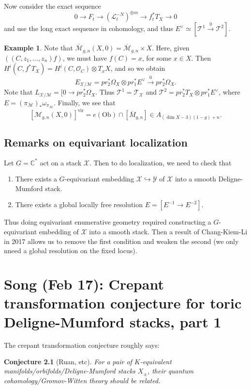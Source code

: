 \documentclass[leqno, openany]{memoir}
\newtheorem{conj}[thm]{Conjecture}
\theoremstyle{definition}
\newtheorem{exm}[thm]{Example}
\theoremstyle{remark}
\theoremstyle{plain}
\theoremstyle{definition}
\theoremstyle{remark}
\newcommand{\C}{\mathbb{C}}
\newcommand{\mc}[1]{\mathcal{#1}}
\newcommand{\mr}[1]{\mathrm{#1}}
\newcommand{\ol}[1]{\overline{#1}}
\begin{document}
Now consider the exact sequence
\[ 0 \to F_t \to (\mc{L}_t^{-N})^{\oplus m} \to f_t^* T_X \to 0 \]
and use the long exact sequence in cohomology, and thus $E^{\vee} \simeq [\mc{T}^1 \xrightarrow{0} \mc{T}^2]$.

\begin{exm}
    Note that $\ol{\mc{M}}_{g, n}(X, 0) = \ol{\mc{M}}_{g,n} \times X$. Here, given $((C, z_1, \ldots, z_n) f)$, we must have $f(C) = x$, for some $x \in X$. Then $H^i(C, f^* T_X) = H^i(C, \mc{O}_C) \otimes T_x X$, and so we obtain
    \[ E_{\mc{X}/\mc{M}} = pr_2^* \Omega_X \otimes pr_1^* E^{\vee} \xrightarrow{0} pr_2^* \Omega_X. \]
    Note that $L_{\mc{X}/\mc{M}} = [0 \to pr_2^* \Omega_X$. Thus $\mc{T}^1 = \mc{T}_{\mc{X}}$ and $\mc{T}^2 = pr_2^* T_X \otimes pr_1^* E^{\vee}$, where $E = (\pi_{\mc{M}})_* \omega_{\pi_{\mc{M}}}$. Finally, we see that
    \[ [\mc{M}_{g, n}(X, 0)]^{\mr{vir}} = e(\mr{Ob}) \cap [\ol{M}_{g, n}] \in A_{(\dim X - 3)(1-g) + n}. \]
\end{exm}

\section{Remarks on equivariant localization}
Let $G = \C^*$ act on a stack $\mc{X}$. Then to do localization, we need to check that
\begin{enumerate}
    \item There exists a $G$-equivariant embedding $\mc{X} \hookrightarrow \mc{Y}$ of $\mc{X}$ into a smooth Deligne-Mumford stack.
    \item There exists a global locally free resolution $E = [E^{-1} \to E^{-2}]$.
\end{enumerate}
Thus doing equivariant enumerative geometry required constructing a $G$-equivariant embedding of $\mc{X}$ into a smooth stack. Then a result of Chang-Kiem-Li in 2017 allows us to remove the first condition and weaken the second (we only nneed a global resolution on the fixed locus).

\chapter{Song (Feb 17): Crepant transformation conjecture for toric Deligne-Mumford stacks, part 1}%

The crepant transformation conjecture roughly says:
\begin{conj}[Ruan, etc]
    For a pair of $K$-equivalent manifolds/orbifolds/Deligne-Mumford stacks $X_{\pm}$, their quantum cohomology/Gromov-Witten theory should be related.
\end{conj}
\end{document}
